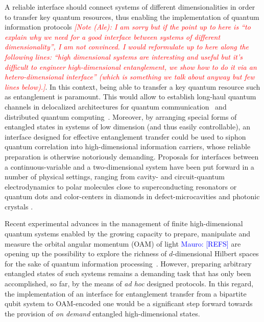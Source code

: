 \documentclass[
	aps, pra,
	superscriptaddress, twocolumn,
	floatfix,
	10pt
]{revtex4-1}
\newcommand{\parTitle}[1]{\noindent{\color{Mahogany}(\emph{#1})}}
\newcommand{\MP}[1]{\textcolor{blue}{Mauro: #1}}
\newcommand{\commale}[1]{{\textcolor{red} {\it{[Note (Ale): #1]}}}}
\begin{document}
\parTitle{What is a good interface?}
A reliable interface should connect systems of different dimensionalities in order to transfer key quantum resources, thus enabling the implementation of quantum information protocols \commale{I am sorry but if the point up to here is ``to explain why we need for a good interface between systems of different dimensionality'', I am not convinced. I would reformulate up to here along the following lines: ``high dimensional systems are interesting and useful but it's difficult to engineer high-dimensional entanglement, we show how to do it via an hetero-dimensional interface'' (which is something we talk about anyway but few lines below).}.
In this context, being able to transfer a key quantum resource such as entanglement is paramount.
This would allow to establish long-haul quantum channels in delocalized architectures for quantum communication~\cite{Kimble2008} and distributed quantum computing~\cite{Collins2001,Eisert2000,Huelga2001,Huelga2002,Paternostro2003}. Moreover, by arranging special forms of entangled states in systems of low dimension (and thus easily controllable), an interface designed for effective entanglement transfer could be used to siphon quantum correlation into high-dimensional information carriers, whose reliable preparation is otherwise notoriously demanding.
Proposals for interfaces between a continuous-variable and a two-dimensional system have been put forward in a number of physical settings, ranging from cavity- and circuit-quantum electrodynamics to polar molecules close to superconducting resonators or quantum dots and color-centers in diamonds in defect-microcavities and photonic crystals . 

\parTitle{Recent experimental advances}
Recent experimental advances in the management of finite high-dimensional quantum systems enabled by the growing capacity to prepare, manipulate and measure the orbital angular momentum (OAM) of light \MP{[REFS]} are opening up the possibility to explore the richness of $d$-dimensional Hilbert spaces for the sake of quantum information processing~\cite{Brunner2014,Campbell2012,Howland2013,Karimipour2002,Durt2004,Fitzi2001,Bruss2002,Cerf2002,Bechmann2000}. However, preparing arbitrary entangled states of such systems remains a demanding task that has only been accomplished, so far, by the means of {\it ad hoc} designed protocols. In this regard, the implementation of an interface for entanglement transfer from a bipartite qubit system to OAM-encoded one would be a significant step forward towards the provision of {\it on demand} entangled high-dimensional states. 
\end{document}
